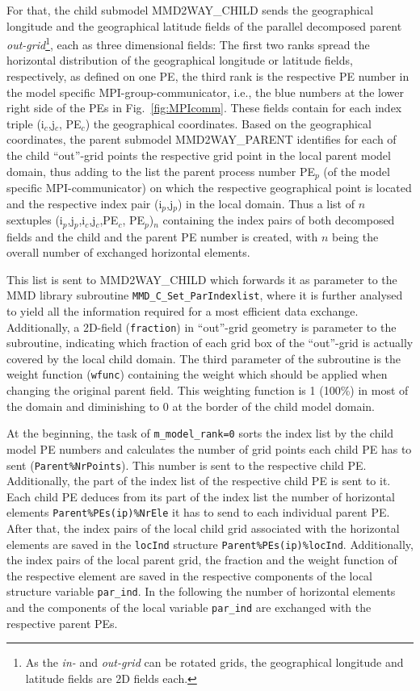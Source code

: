 \documentclass[twoside]{article}
\begin{document}
\begin{itemize}
For that, the child submodel MMD2WAY\_CHILD sends the geographical
longitude and  
the geographical latitude fields of the parallel decomposed parent
 {\it out-grid}\footnote{As the {\it in-} and {\it out-grid} can be rotated
 grids, the geographical longitude and latitude fields are 2D fields each.},
 each as three  
dimensional fields: The first two ranks spread the horizontal
distribution of the 
 geographical longitude or latitude fields, respectively, as defined on one 
PE, the third rank is the respective PE number in the model specific 
MPI-group-communicator, i.e., the blue numbers at the lower right side of the
PEs in Fig.\ \ref{fig:MPIcomm}. These fields
 contain for each index triple (i$_c$,j$_c$, PE$_c$) the geographical
 coordinates. 
 Based on the geographical coordinates, the parent submodel MMD2WAY\_PARENT
 identifies for each of the child ``out''-grid points the respective grid point
 in the local parent model domain, thus adding to the list the parent process 
number PE$_p$ (of the model specific MPI-communicator) on which the respective 
geographical point is located and the 
respective index pair  (i$_p$,j$_p$) in the local domain.
Thus a list of $n$ sextuples (i$_p$,j$_p$,i$_c$,j$_c$,PE$_c$, PE$_p$)$_n$  
containing the index pairs of both decomposed fields and the child and the
 parent PE number is created, with $n$ being the overall number of exchanged 
horizontal elements.

This list is sent to MMD2WAY\_CHILD which forwards it as parameter to
 the  MMD library subroutine \verb|MMD_C_Set_ParIndexlist|, where it
 is further analysed to yield all the information
required for a most efficient data exchange. Additionally, a 2D-field
 (\verb|fraction|) in ``out''-grid geometry is parameter to the
 subroutine, indicating 
 which fraction of each grid box of the ``out''-grid is actually
 covered by the local child domain. The third parameter of the
 subroutine is the weight function (\verb|wfunc|) containing the
 weight which should be applied when changing the original parent
 field. This weighting function is 1 (100\%) in most of the domain and
 diminishing to 0 at the border of the child model domain.

At the beginning, the task of 
\verb|m_model_rank=0| sorts the index list by the child model PE numbers and 
calculates the number of grid points each child PE has to sent 
(\verb|Parent%NrPoints|). This number is sent to the respective child PE. 
Additionally, the part of the index list of the respective child PE
 is sent to it.
Each child PE deduces from its part of the index list the number of 
horizontal elements \verb|Parent%PEs(ip)%NrEle| it has to send to 
each individual parent PE. After that, the index pairs of the local child grid 
 associated with the horizontal elements are saved 
in the \verb|locInd| structure \verb|Parent%PEs(ip)%locInd|. Additionally,
the index pairs of the local parent grid, the fraction and the weight
function of the respective element are saved in the respective components of
the local structure variable \verb|par_ind|.  
In the following the number of horizontal elements and the components
of the local variable \verb|par_ind| are exchanged with the respective
parent PEs.


\end{itemize}
\end{document}
